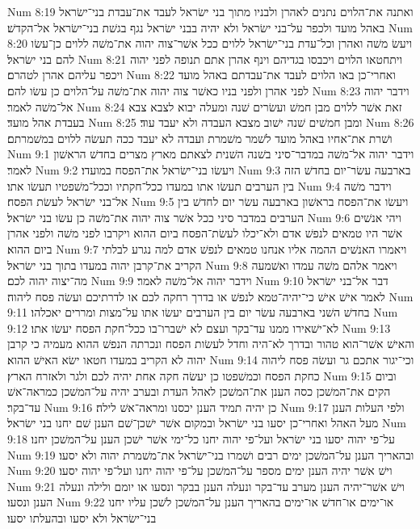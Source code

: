 Num 8:19  ואתנה את־הלוים נתנים לאהרן ולבניו מתוך בני ישׂראל לעבד את־עבדת בני־ישׂראל באהל מועד ולכפר על־בני ישׂראל ולא יהיה בבני ישׂראל נגף בגשׁת בני־ישׂראל אל־הקדשׁ׃
Num 8:20  ויעשׂ משׁה ואהרן וכל־עדת בני־ישׂראל ללוים ככל אשׁר־צוה יהוה את־משׁה ללוים כן־עשׂו להם בני ישׂראל׃
Num 8:21  ויתחטאו הלוים ויכבסו בגדיהם וינף אהרן אתם תנופה לפני יהוה ויכפר עליהם אהרן לטהרם׃
Num 8:22  ואחרי־כן באו הלוים לעבד את־עבדתם באהל מועד לפני אהרן ולפני בניו כאשׁר צוה יהוה את־משׁה על־הלוים כן עשׂו להם׃
Num 8:23  וידבר יהוה אל־משׁה לאמר׃
Num 8:24  זאת אשׁר ללוים מבן חמשׁ ועשׂרים שׁנה ומעלה יבוא לצבא צבא בעבדת אהל מועד׃
Num 8:25  ומבן חמשׁים שׁנה ישׁוב מצבא העבדה ולא יעבד עוד׃
Num 8:26  ושׁרת את־אחיו באהל מועד לשׁמר משׁמרת ועבדה לא יעבד ככה תעשׂה ללוים במשׁמרתם׃
Num 9:1  וידבר יהוה אל־משׁה במדבר־סיני בשׁנה השׁנית לצאתם מארץ מצרים בחדשׁ הראשׁון לאמר׃
Num 9:2  ויעשׂו בני־ישׂראל את־הפסח במועדו׃
Num 9:3  בארבעה עשׂר־יום בחדשׁ הזה בין הערבים תעשׂו אתו במעדו ככל־חקתיו וככל־משׁפטיו תעשׂו אתו׃
Num 9:4  וידבר משׁה אל־בני ישׂראל לעשׂת הפסח׃
Num 9:5  ויעשׂו את־הפסח בראשׁון בארבעה עשׂר יום לחדשׁ בין הערבים במדבר סיני ככל אשׁר צוה יהוה את־משׁה כן עשׂו בני ישׂראל׃
Num 9:6  ויהי אנשׁים אשׁר היו טמאים לנפשׁ אדם ולא־יכלו לעשׂת־הפסח ביום ההוא ויקרבו לפני משׁה ולפני אהרן ביום ההוא׃
Num 9:7  ויאמרו האנשׁים ההמה אליו אנחנו טמאים לנפשׁ אדם למה נגרע לבלתי הקריב את־קרבן יהוה במעדו בתוך בני ישׂראל׃
Num 9:8  ויאמר אלהם משׁה עמדו ואשׁמעה מה־יצוה יהוה לכם׃
Num 9:9  וידבר יהוה אל־משׁה לאמר׃
Num 9:10  דבר אל־בני ישׂראל לאמר אישׁ אישׁ כי־יהיה־טמא לנפשׁ או בדרך רחקה לכם או לדרתיכם ועשׂה פסח ליהוה׃
Num 9:11  בחדשׁ השׁני בארבעה עשׂר יום בין הערבים יעשׂו אתו על־מצות ומררים יאכלהו׃
Num 9:12  לא־ישׁאירו ממנו עד־בקר ועצם לא ישׁברו־בו ככל־חקת הפסח יעשׂו אתו׃
Num 9:13  והאישׁ אשׁר־הוא טהור ובדרך לא־היה וחדל לעשׂות הפסח ונכרתה הנפשׁ ההוא מעמיה כי קרבן יהוה לא הקריב במעדו חטאו ישׂא האישׁ ההוא׃
Num 9:14  וכי־יגור אתכם גר ועשׂה פסח ליהוה כחקת הפסח וכמשׁפטו כן יעשׂה חקה אחת יהיה לכם ולגר ולאזרח הארץ׃
Num 9:15  וביום הקים את־המשׁכן כסה הענן את־המשׁכן לאהל העדת ובערב יהיה על־המשׁכן כמראה־אשׁ עד־בקר׃
Num 9:16  כן יהיה תמיד הענן יכסנו ומראה־אשׁ לילה׃
Num 9:17  ולפי העלות הענן מעל האהל ואחרי־כן יסעו בני ישׂראל ובמקום אשׁר ישׁכן־שׁם הענן שׁם יחנו בני ישׂראל׃
Num 9:18  על־פי יהוה יסעו בני ישׂראל ועל־פי יהוה יחנו כל־ימי אשׁר ישׁכן הענן על־המשׁכן יחנו׃
Num 9:19  ובהאריך הענן על־המשׁכן ימים רבים ושׁמרו בני־ישׂראל את־משׁמרת יהוה ולא יסעו׃
Num 9:20  וישׁ אשׁר יהיה הענן ימים מספר על־המשׁכן על־פי יהוה יחנו ועל־פי יהוה יסעו׃
Num 9:21  וישׁ אשׁר־יהיה הענן מערב עד־בקר ונעלה הענן בבקר ונסעו או יומם ולילה ונעלה הענן ונסעו׃
Num 9:22  או־ימים או־חדשׁ או־ימים בהאריך הענן על־המשׁכן לשׁכן עליו יחנו בני־ישׂראל ולא יסעו ובהעלתו יסעו׃
